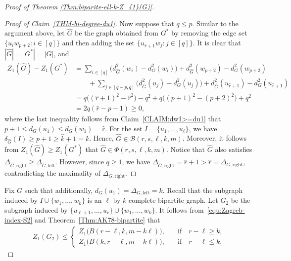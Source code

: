 \documentclass[11pt,a4paper]{article}
\begin{document}
\begin{proof}[Proof of Theorem \ref{Thm:biparite-ell-k-Z_{1}(G)}]
\begin{proof}[Proof of Claim~\ref{THM-bi-degree-du1}]
        Now suppose that $q \le p$. 
        Similar to the argument above, let $\hat{G}$ be the graph obtained from $G^{\ast}$ by removing the edge set $\{u_i w_{p+2} \colon i \in [q]\}$ and then adding the set $\{u_{\hat{r}+1} w_j \colon j \in [q]\}$. 
        It is clear that $|\hat{G}| = |G^{\ast}| = |G|$, and 
        \begin{align*}
            Z_{1}(\hat{G}) - Z_{1}(G^{\ast})
            & = \sum_{i \in [q]} \big( d_{\hat{G}}^{2}(w_i) - d_{G}^{2}(w_i) \big) + d_{\hat{G}}^{2}(w_{p+2}) - d_{G}^{2}(w_{p+2}) \\
            & \qquad + \sum_{j \in [q-p, q]} \big( d_{\hat{G}}^{2}(u_j) - d_{G}^{2}(u_j) \big) + d_{\hat{G}}^{2}(u_{\hat{r}+1}) - d_{G}^{2}(u_{\hat{r}+1}) \\
            & = q \big( (\hat{r}+1)^2 - \hat{r}^2 \big) - q^2 + q \big( (p+1)^2 - (p+2)^2 \big) + q^2 \\
            & = 2q(\hat{r} - p-1) 
            \ge 0, 
        \end{align*}
        where the last inequality follows from Claim~\ref{CLAIM:dw1>=du1} that $p+1 \le d_{G}(u_1) \le d_{G}(w_1) = \hat{r}$. 
        For the set $I = \{u_1, \ldots,u_{\ell}\}$, we have $\delta_{\hat{G}}(I) \ge p+1 \ge \hat{k}+1 =k$. 
        Hence, $\hat{G} \in \mathcal{B}(r,s,\ell,k,m)$. 
        Moreover, it follows from $Z_{1}(\hat{G}) \ge Z_{1}(G^{\ast})$ that $\hat{G} \in \Phi(r,s,\ell,k,m)$. 
        Notice that $\hat{G}$ also satisfies $\Delta_{\hat{G}, \mathrm{right}} \ge \Delta_{\hat{G}, \mathrm{left}}$. 
        However, since $q \ge 1$, we have $\Delta_{\hat{G},\mathrm{right}} = \hat{r} + 1 > \hat{r} = \Delta_{G,\mathrm{right}}$, contradicting the maximality of $\Delta_{G,\mathrm{right}}$.  
    \end{proof}%

    Fix $G$ such that additionally, $d_{G}(u_1) = \Delta_{G, \mathrm{left}} = k$. 
    Recall that the subgraph induced by $I\cup \{w_1,\ldots,w_{k}\}$ is an $\ell$ by $k$ complete bipartite graph. 
    Let $G_2$ be the subgraph induced by $\{u_{\ell +1}, \ldots, u_r\}\cup \{w_1,\ldots,w_{k}\}$. 
    It follows from~\eqref{equ:Zagreb-index-S2} and Theorem~\ref{Thm:AK78-bipartite} that 
    \begin{align*}
        Z_{1}(G_2) \le 
        \begin{cases}
            Z_{1}\big( B(r-\ell, k, m - k\ell) \big), & \quad\text{if}\quad r-\ell  \ge k, \\[0.5em]
            Z_{1}\big( B(k,r-\ell,m-k\ell) \big), & \quad\text{if}\quad r-\ell  \le k. 
        \end{cases}
    \end{align*}


\end{proof}
\end{document}
